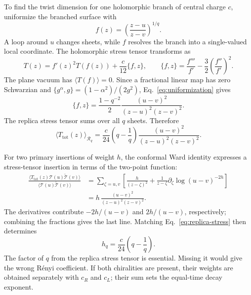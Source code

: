 \documentclass[aps,prb,onecolumn,nofootinbib,superscriptaddress]{revtex4-2}
\begin{document}
To find the twist dimension for one holomorphic branch of central charge
$c$, uniformize the branched surface with
\begin{equation}
 f(z)=\left(\frac{z-u}{z-v}\right)^{1/q}.
 \label{eq:uniformization}
\end{equation}
A loop around $u$ changes sheets, while $f$ resolves the branch into a
single-valued local coordinate. The holomorphic stress tensor transforms as
\begin{equation}
 T(z)=f'(z)^2T(f(z))+\frac{c}{12}\{f,z\},\qquad
 \{f,z\}=\frac{f'''}{f'}-\frac32\left(\frac{f''}{f'}\right)^2.
 \label{eq:schwarzian}
\end{equation}
The plane vacuum has $\langle T(f)\rangle=0$. Since a fractional linear
map has zero Schwarzian and
$\{g^\alpha,g\}=(1-\alpha^2)/(2g^2)$, Eq.~\eqref{eq:uniformization} gives
\begin{equation}
 \{f,z\}=\frac{1-q^{-2}}{2}
 \frac{(u-v)^2}{(z-u)^2(z-v)^2}.
 \label{eq:schwarzian-result}
\end{equation}
The replica stress tensor sums over all $q$ sheets. Therefore
\begin{equation}
 \langle T_{\mathrm{tot}}(z)\rangle_{\mathcal R_q}
 =\frac{c}{24}\left(q-\frac1q\right)
   \frac{(u-v)^2}{(z-u)^2(z-v)^2}.
 \label{eq:replica-stress}
\end{equation}

For two primary insertions of weight $h$, the conformal Ward identity
expresses a stress-tensor insertion in terms of the two-point function:
\begin{align}
 \frac{\langle T_{\mathrm{tot}}(z)\mathcal T(u)
                      \widetilde{\mathcal T}(v)\rangle}
      {\langle\mathcal T(u)\widetilde{\mathcal T}(v)\rangle}
 &=\sum_{\zeta=u,v}\left[
    \frac{h}{(z-\zeta)^2}
    +\frac{1}{z-\zeta}\partial_\zeta
       \log (u-v)^{-2h}\right]\nonumber\\
 &=h\,\frac{(u-v)^2}{(z-u)^2(z-v)^2}.
 \label{eq:ward}
\end{align}
The derivatives contribute $-2h/(u-v)$ and $2h/(u-v)$, respectively;
combining the fractions gives the last line. Matching
Eq.~\eqref{eq:replica-stress} then determines
\begin{equation}
 h_q=\frac{c}{24}\left(q-\frac1q\right).
 \label{eq:twist-weight}
\end{equation}
The factor of $q$ from the replica stress tensor is essential. Missing it
would give the wrong R\'enyi coefficient. If both chiralities are present,
their weights are obtained separately with $c_R$ and $c_L$; their sum
sets the equal-time decay exponent.
\end{document}
